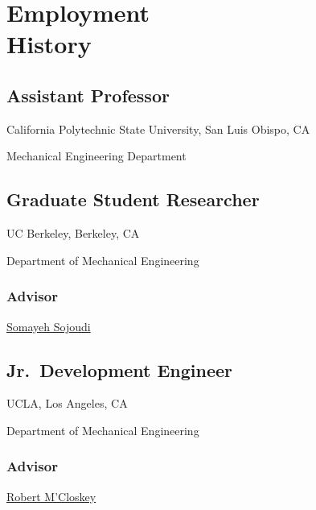 \section{\texorpdfstring{Employment \\[\baselineskip] History}{Employment History}}
\hfill\vspace*{-2\baselineskip}
\subsection{Assistant Professor}

\hspace*{\sectionwidth}California Polytechnic State University, San Luis Obispo, CA

\hspace*{\sectionwidth}Mechanical Engineering Department

\vspace*{\subsectionskip}

\subsection{Graduate Student Researcher}

\hspace*{\sectionwidth}UC Berkeley, Berkeley, CA

\hspace*{\sectionwidth}Department of Mechanical Engineering

\subsubsection{Advisor}
\href{https://people.eecs.berkeley.edu/~sojoudi/}{Somayeh Sojoudi}

\vspace*{\subsectionskip}

\subsection{Jr.\ Development Engineer}

\hspace*{\sectionwidth}UCLA, Los Angeles, CA

\hspace*{\sectionwidth}Department of Mechanical Engineering

\subsubsection{Advisor}
\href{http://www.seas.ucla.edu/mcloskey/}{Robert M'Closkey}

